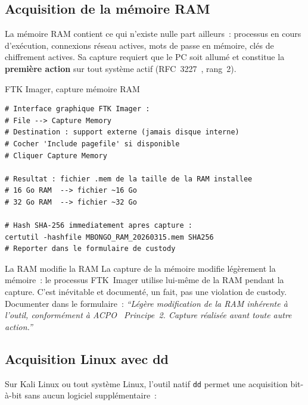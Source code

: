 \subsection{Acquisition de la mémoire RAM}

La mémoire RAM contient ce qui n'existe nulle part ailleurs~: processus
en cours d'exécution, connexions réseau actives, mots de passe en
mémoire, clés de chiffrement actives. Sa capture requiert que le PC soit
allumé et constitue la \textbf{première action} sur tout système actif
(RFC~3227~\cite{rfc3227}, rang~2).

\begin{boxoutils}{FTK Imager, capture mémoire RAM}
\begin{lstlisting}[language=bash_forensique]
# Interface graphique FTK Imager :
# File --> Capture Memory
# Destination : support externe (jamais disque interne)
# Cocher 'Include pagefile' si disponible
# Cliquer Capture Memory

# Resultat : fichier .mem de la taille de la RAM installee
# 16 Go RAM  --> fichier ~16 Go
# 32 Go RAM  --> fichier ~32 Go

# Hash SHA-256 immediatement apres capture :
certutil -hashfile MBONGO_RAM_20260315.mem SHA256
# Reporter dans le formulaire de custody
\end{lstlisting}
\end{boxoutils}

\begin{boiteRemarque}{La RAM modifie la RAM}
La capture de la mémoire modifie légèrement la mémoire~: le processus
FTK~Imager utilise lui-même de la RAM pendant la capture. C'est inévitable
et documenté, un fait, pas une violation de custody. Documenter dans le
formulaire~: \textit{``Légère modification de la RAM inhérente à l'outil,
conformément à ACPO~\cite{acpo2012} Principe~2. Capture réalisée avant toute autre action.''}
\end{boiteRemarque}

\subsection{Acquisition Linux avec dd}

Sur Kali Linux ou tout système Linux, l'outil natif \texttt{dd} permet une
acquisition bit-à-bit sans aucun logiciel supplémentaire~:

